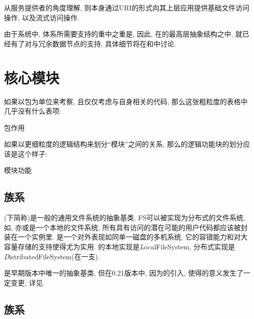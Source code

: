 从服务提供者的角度理解{\HFS}, 则{\HFS}本身通过URI的形式向其上层应用提供基础文件访问操作,
以及流式访问操作.

由于{\Hadoop}系统中, {\HFS}体系所需要支持的重中之重是{\HDFS}, 因此,
在{\HFS}的最高层抽象结构之中, 就已经有了对与冗余数据节点的支持,
具体细节将在和中讨论.

\section{核心模块}
\label{sec:hfs:modules}

如果以包为单位来考察{\HFS}, 且仅仅考虑与{\HFS}自身相关的代码,
那么这张粗粒度的表格中几乎没有什么表项:
\begin{XeDuoLineTabular}{包}{作用}
\end{XeDuoLineTabular}

如果以更细粒度的逻辑结构来划分``模块''之间的关系, 那么{\HFS}的逻辑功能块的划分应该是这个样子:
\begin{XeDuoLineTabular}{模块}{功能}
\end{XeDuoLineTabular}

\subsection{{\FiS}族系}
\label{ssec:hfs:fs}

{\FiS}(下简称{\FS})是一般的通用文件系统的抽象基类.
FS可以被实现为分布式的文件系统, 如{\HDFS}, 亦或是一个本地的文件系统,
所有具有访问{\HDFS}的潜在可能的用户代码都应该被封装在一个{\FiS}实例里.
{\HDFS}是一个对外表现如同单一磁盘的多机系统,
它的容错能力和对大容量存储的支持使得{\HDFS}尤为实用.
{\FiS}的本地实现是{\emph LocalFileSystem},
分布式实现是{\emph DistributedFileSystem}(在{\HDFS}一支).

{\FiS}是{\HadoopFS}早期版本中唯一的抽象基类, 但在0.21版本中,
因为{\AbsFS}的引入, 使得{\FiS}的意义发生了一定变更,
详见.

\subsection{\AbsFS 族系}
\label{ssec:hfs:afs}


